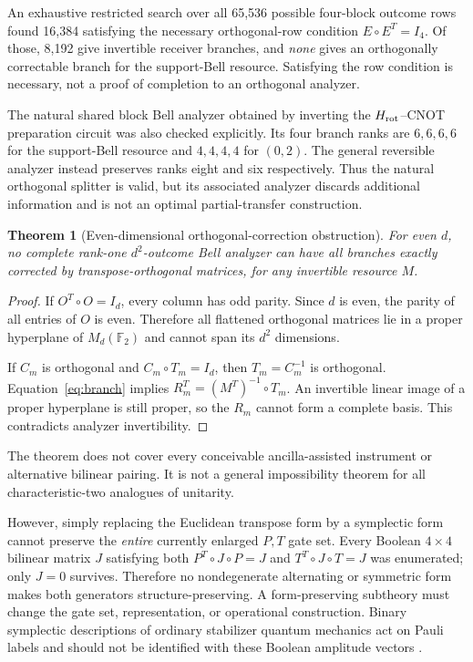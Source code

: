 \documentclass[11pt,a4paper]{article}
\newtheorem{theorem}{Theorem}[section]
\theoremstyle{definition}\newtheorem{definition}[theorem]{Definition}
\newcommand{\F}{\mathbb F_2}
\begin{document}
An exhaustive restricted search over all 65,536 possible four-block outcome rows found 16,384 satisfying the necessary orthogonal-row condition $E\circ E^T=I_4$. Of those, 8,192 give invertible receiver branches, and \emph{none} gives an orthogonally correctable branch for the support-Bell resource. Satisfying the row condition is necessary, not a proof of completion to an orthogonal analyzer.

The natural shared block Bell analyzer obtained by inverting the $H_{\rm rot}$--CNOT preparation circuit was also checked explicitly. Its four branch ranks are $6,6,6,6$ for the support-Bell resource and $4,4,4,4$ for $(0,2)$. The general reversible analyzer instead preserves ranks eight and six respectively. Thus the natural orthogonal splitter is valid, but its associated analyzer discards additional information and is not an optimal partial-transfer construction.


\begin{theorem}[Even-dimensional orthogonal-correction obstruction]
For even $d$, no complete rank-one $d^2$-outcome Bell analyzer can have all branches exactly corrected by transpose-orthogonal matrices, for any invertible resource $M$.
\end{theorem}
\begin{proof}
If $O^T\circ O=I_d$, every column has odd parity. Since $d$ is even, the parity of all entries of $O$ is even. Therefore all flattened orthogonal matrices lie in a proper hyperplane of $M_d(\F)$ and cannot span its $d^2$ dimensions.

If $C_m$ is orthogonal and $C_m\circ T_m=I_d$, then $T_m=C_m^{-1}$ is orthogonal. Equation~\eqref{eq:branch} implies $R_m^T=(M^T)^{-1}\circ T_m$. An invertible linear image of a proper hyperplane is still proper, so the $R_m$ cannot form a complete basis. This contradicts analyzer invertibility.
\end{proof}
The theorem does not cover every conceivable ancilla-assisted instrument or alternative bilinear pairing. It is not a general impossibility theorem for all characteristic-two analogues of unitarity.

However, simply replacing the Euclidean transpose form by a symplectic form cannot preserve the \emph{entire} currently enlarged $P,T$ gate set. Every Boolean $4\times4$ bilinear matrix $J$ satisfying both $P^T\circ J\circ P=J$ and $T^T\circ J\circ T=J$ was enumerated; only $J=0$ survives. Therefore no nondegenerate alternating or symmetric form makes both generators structure-preserving. A form-preserving subtheory must change the gate set, representation, or operational construction. Binary symplectic descriptions of ordinary stabilizer quantum mechanics act on Pauli labels and should not be identified with these Boolean amplitude vectors \cite{gottesman1997}.
\end{document}
